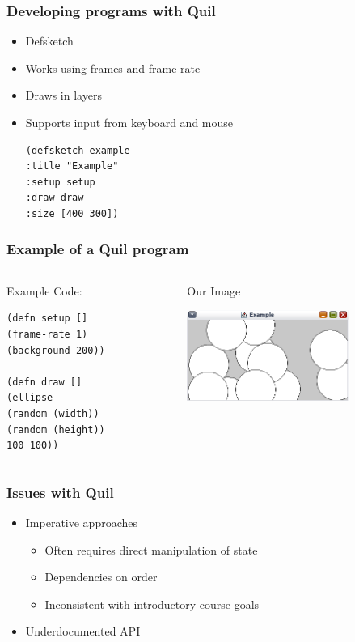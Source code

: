 \documentclass{beamer}
\begin{document}
\begin{frame}[fragile]
\frametitle{Developing programs with Quil}
\begin{itemize}
\item Defsketch
\item Works using frames and frame rate
\item Draws in layers
\item Supports input from keyboard and mouse
\begin{verbatim}
(defsketch example 
:title "Example"
:setup setup
:draw draw
:size [400 300])
\end{verbatim}
\end{itemize}
\end{frame}

\begin{frame}[fragile]
\frametitle{Example of a Quil program}
  \begin{columns}[T]
    \begin{column}{.5\textwidth}
      \begin{block}{Example Code:}
        \begin{verbatim}
(defn setup []
(frame-rate 1)
(background 200))

(defn draw []
(ellipse
(random (width))
(random (height))
100 100))
        \end{verbatim}
      \end{block}
    \end{column}

    \begin{column}{.5\textwidth}
      \begin{block}{Our Image}
        \begin{center}
        \includegraphics[width=150pt]{quil-example}
        \end{center}
      \end{block}
    \end{column}
  \end{columns}

\end{frame}

\begin{frame}
\frametitle{Issues with Quil}
\begin{itemize}
\item Imperative approaches
	\begin{itemize}
		\item Often requires direct manipulation of state
		\item Dependencies on order
		\item Inconsistent with introductory course goals
	\end{itemize}
\item Underdocumented API
\end{itemize}
\end{frame}
\end{document}

